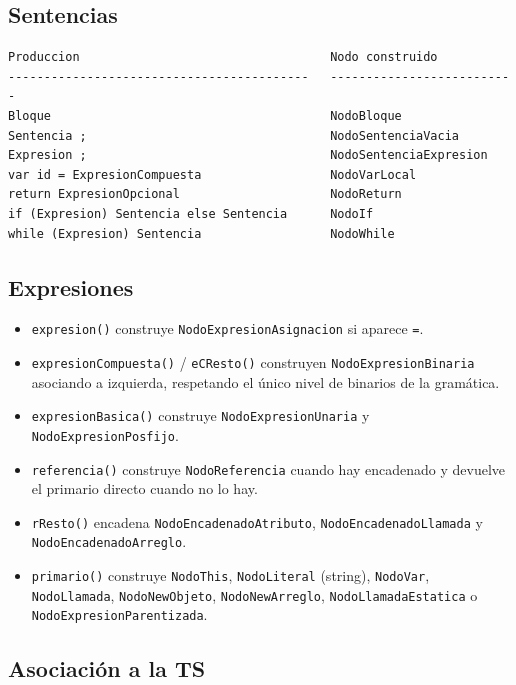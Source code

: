 \documentclass[11pt,a4paper]{article}
\begin{document}
\subsection{Sentencias}

{\footnotesize
\begin{verbatim}
Produccion                                   Nodo construido
------------------------------------------   --------------------------
Bloque                                       NodoBloque
Sentencia ;                                  NodoSentenciaVacia
Expresion ;                                  NodoSentenciaExpresion
var id = ExpresionCompuesta                  NodoVarLocal
return ExpresionOpcional                     NodoReturn
if (Expresion) Sentencia else Sentencia      NodoIf
while (Expresion) Sentencia                  NodoWhile
\end{verbatim}
}

\subsection{Expresiones}

\begin{itemize}
  \item \texttt{expresion()} construye \texttt{NodoExpresionAsignacion} si
        aparece \texttt{=}.
  \item \texttt{expresionCompuesta()} / \texttt{eCResto()} construyen
        \texttt{NodoExpresionBinaria} asociando a izquierda, respetando el único
        nivel de binarios de la gramática.
  \item \texttt{expresionBasica()} construye \texttt{NodoExpresionUnaria} y
        \texttt{NodoExpresionPosfijo}.
  \item \texttt{referencia()} construye \texttt{NodoReferencia} cuando hay
        encadenado y devuelve el primario directo cuando no lo hay.
  \item \texttt{rResto()} encadena \texttt{NodoEncadenadoAtributo},
        \texttt{NodoEncadenadoLlamada} y \texttt{NodoEncadenadoArreglo}.
  \item \texttt{primario()} construye \texttt{NodoThis}, \texttt{NodoLiteral}
        (string), \texttt{NodoVar}, \texttt{NodoLlamada}, \texttt{NodoNewObjeto},
        \texttt{NodoNewArreglo}, \texttt{NodoLlamadaEstatica} o
        \texttt{NodoExpresionParentizada}.
\end{itemize}

\subsection{Asociación a la TS}
\end{document}
